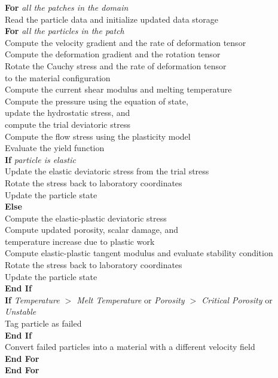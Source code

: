 \begin{table}[p]
\begin{tabbing}
    {\bf For} {\it all the patches in the domain}\\
      \> Read the particle data and initialize updated data storage\\
      \> {\bf For} {\it all the particles in the patch}\\ 
      \>\>   Compute the velocity gradient and the rate of deformation tensor\\ 
      \>\>   Compute the deformation gradient and the rotation tensor\\
      \>\>   Rotate the Cauchy stress and the rate of deformation tensor \\
      \>\>\> to the material configuration\\
      \>\>   Compute the current shear modulus and melting temperature\\
      \>\>   Compute the pressure using the equation of state,  \\
      \>\>\>  update the hydrostatic stress, and  \\
      \>\>\>  compute the trial deviatoric stress\\
      \>\>   Compute the flow stress using the plasticity model\\
      \>\>   Evaluate the yield function\\
      \>\>   {\bf If} {\it particle is elastic} \\
      \>\>\>     Update the elastic deviatoric stress from the trial stress\\
      \>\>\>     Rotate the stress back to laboratory coordinates\\
      \>\>\>     Update the particle state\\
      \>\>   {\bf Else} \\
      \>\>\>     Compute the elastic-plastic deviatoric stress\\
      \>\>\>     Compute updated porosity, scalar damage, and \\
      \>\>\>\>       temperature increase due to plastic work\\
      \>\>\>     Compute elastic-plastic tangent modulus and 
                     evaluate stability condition\\
      \>\>\>     Rotate the stress back to laboratory coordinates\\
      \>\>\>     Update the particle state\\
      \>\>   {\bf End If} \\
      \>\>  {\bf If} 
             {\it Temperature $>$ Melt Temperature} or 
             {\it Porosity $>$ Critical Porosity} or
             {\it Unstable}\\
      \>\>\>       Tag particle as failed\\
      \>\>  {\bf End If} \\
      \>\> Convert failed particles into a material with a different 
           velocity field \\
      \> {\bf End For} \\
    {\bf End For}
    \end{tabbing}
  \end{table}
      
